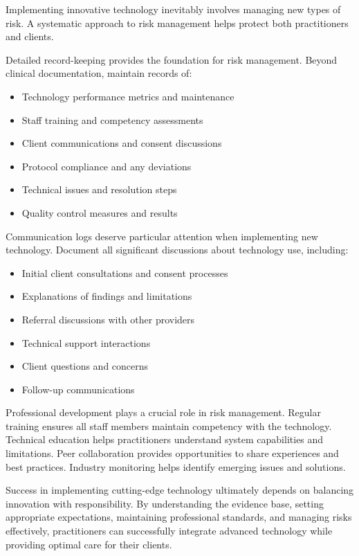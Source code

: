 \documentclass[
  Letterpaper,
]{scrbook}
\providecommand{\tightlist}{%
  \setlength{\itemsep}{0pt}\setlength{\parskip}{0pt}}\usepackage{longtable,booktabs,array}
\begin{document}
Implementing innovative technology inevitably involves managing new
types of risk. A systematic approach to risk management helps protect
both practitioners and clients.

Detailed record-keeping provides the foundation for risk management.
Beyond clinical documentation, maintain records of:

\begin{itemize}
\tightlist
\item
  Technology performance metrics and maintenance
\item
  Staff training and competency assessments
\item
  Client communications and consent discussions
\item
  Protocol compliance and any deviations
\item
  Technical issues and resolution steps
\item
  Quality control measures and results
\end{itemize}

Communication logs deserve particular attention when implementing new
technology. Document all significant discussions about technology use,
including:

\begin{itemize}
\tightlist
\item
  Initial client consultations and consent processes
\item
  Explanations of findings and limitations
\item
  Referral discussions with other providers
\item
  Technical support interactions
\item
  Client questions and concerns
\item
  Follow-up communications
\end{itemize}

Professional development plays a crucial role in risk management.
Regular training ensures all staff members maintain competency with the
technology. Technical education helps practitioners understand system
capabilities and limitations. Peer collaboration provides opportunities
to share experiences and best practices. Industry monitoring helps
identify emerging issues and solutions.

Success in implementing cutting-edge technology ultimately depends on
balancing innovation with responsibility. By understanding the evidence
base, setting appropriate expectations, maintaining professional
standards, and managing risks effectively, practitioners can
successfully integrate advanced technology while providing optimal care
for their clients.
\end{document}
